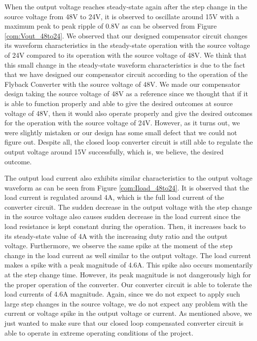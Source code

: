 When the output voltage reaches steady-state again after the step change in the source voltage from 48V to 24V, it is observed to oscillate around 15V with a maximum peak to peak ripple of 0.8V as can be observed from Figure \ref{com:Vout_48to24}. We observed that our designed compensator circuit changes its waveform characteristics in the steady-state operation with the source voltage of 24V compared to its operation with the source voltage of 48V. We think that this small change in the steady-state waveform characteristics is due to the fact that we have designed our compensator circuit according to the operation of the Flyback Converter with the source voltage of 48V. We made our compensator design taking the source voltage of 48V as a reference since we thought that if it is able to function properly and able to give the desired outcomes at source voltage of 48V, then it would also operate properly and give the desired outcomes for the operation with the source voltage of 24V. However, as it turns out, we were slightly mistaken or our design has some small defect that we could not figure out. Despite all, the closed loop converter circuit is still able to regulate the output voltage around 15V successfully, which is, we believe, the desired outcome.

The output load current also exhibits similar characteristics to the output voltage waveform as can be seen from Figure \ref{com:Iload_48to24}. It is observed that the load current is regulated around 4A, which is the full load current of the converter circuit. The sudden decrease in the output voltage with the step change in the source voltage also causes sudden decrease in the load current since the load resistance is kept constant during the operation. Then, it increases back to its steady-state value of 4A with the increasing duty ratio and the output voltage. Furthermore, we observe the same spike at the moment of the step change in the load current as well similar to the output voltage. The load current makes a spike with a peak magnitude of 4.6A. This spike also occurs momentarily at the step change time. However, its peak magnitude is not dangerously high for the proper operation of the converter. Our converter circuit is able to tolerate the load currents of 4.6A magnitude. Again, since we do not expect to apply such large step changes in the source voltage, we do not expect any problem with the current or voltage spike in the output voltage or current. As mentioned above, we just wanted to make sure that our closed loop compensated converter circuit is able to operate in extreme operating conditions of the project.

